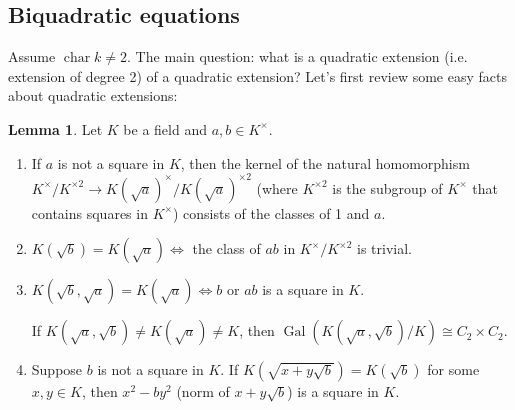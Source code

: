 \documentclass{article}
\newcommand{\Char}{\operatorname{char}}
\newcommand{\Gal}{\operatorname{Gal}}
\theoremstyle{definition}
\newtheorem{lemma}[defn]{Lemma}
\begin{document}
\subsection{Biquadratic equations}
Assume $\Char k\neq 2$. The main question: what is a quadratic extension (i.e. extension of degree 2) of a quadratic extension? Let's first review some easy facts about quadratic extensions:
\begin{lemma}
\label{lemma:biquadratic}
Let $K$ be a field and $a,b\in K^\times$.
\begin{enumerate}
\item If $a$ is not a square in $K$, then the kernel of the natural homomorphism $K^\times/K^{\times 2} \rightarrow K\left(\sqrt a\right)^\times/K\left(\sqrt a\right)^{\times 2}$ (where $K^{\times 2}$ is the subgroup of $K^\times$ that contains squares in $K^\times$) consists of the classes of 1 and $a$.
\item $K\left(\sqrt b\right)=K\left(\sqrt a\right)\iff$ the class of $ab$ in $K^\times/K^{\times 2}$ is trivial.
\item $K\left(\sqrt b,\sqrt a\right)=K\left(\sqrt a\right)\iff b$ or $ab$ is a square in $K$.

If $K\left(\sqrt a,\sqrt b\right)\neq K\left(\sqrt a\right)\neq K$, then $\Gal\left(K\left(\sqrt a,\sqrt b\right)/K\right)\cong C_2\times C_2$.
\item Suppose $b$ is not a square in $K$. If $K\left(\sqrt{x+y\sqrt b}\right)=K\left(\sqrt b\right)$ for some $x,y\in K$, then $x^2-by^2$ (norm of $x+y\sqrt b$) is a square in $K$.
\end{enumerate}
\end{lemma}
\end{document}
